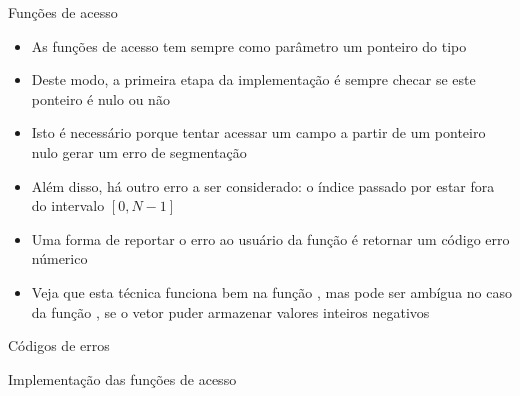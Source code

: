 \begin{frame}[fragile]{Funções de acesso}

    \begin{itemize}
        \item As funções de acesso tem sempre como parâmetro um ponteiro do tipo 

        \item Deste modo, a primeira etapa da implementação é sempre checar se este ponteiro
        é nulo ou não

        \item Isto é necessário porque tentar acessar um campo a partir de um ponteiro nulo
        gerar um erro de segmentação

        \item Além disso, há outro erro a ser considerado: o índice passado por estar fora do
        intervalo $[0, N - 1]$

        \item Uma forma de reportar o erro ao usuário da função é retornar um código erro númerico

        \item Veja que esta técnica funciona bem na função , mas pode ser 
        ambígua no caso da função , se o vetor puder armazenar valores
        inteiros negativos

    \end{itemize}

\end{frame}

\begin{frame}[fragile]{Códigos de erros}
\end{frame}

\begin{frame}[fragile]{Implementação das funções de acesso}
\end{frame}
